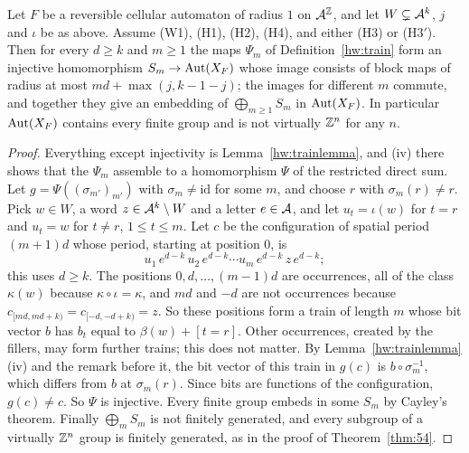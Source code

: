 \begin{theorem}\label{hw:general}
Let $F$ be a reversible cellular automaton of radius $1$ on $\mathcal{A}^{\mathbb{Z}}$, and let $W\subsetneq\mathcal{A}^k$, $j$ and $\iota$ be as above. Assume \textup{(W1)}, \textup{(H1)}, \textup{(H2)}, \textup{(H4)}, and either \textup{(H3)} or \textup{(H3$'$)}. Then for every $d\ge k$ and $m\ge1$ the maps $\Psi_m$ of Definition~\ref{hw:train} form an injective homomorphism $S_m\to\operatorname{Aut}(X_F)$ whose image consists of block maps of radius at most $md+\max(j,k-1-j)$; the images for different $m$ commute, and together they give an embedding of $\bigoplus_{m\ge1}S_m$ in $\operatorname{Aut}(X_F)$. In particular $\operatorname{Aut}(X_F)$ contains every finite group and is not virtually $\mathbb{Z}^n$ for any $n$.
\end{theorem}

\begin{proof}
Everything except injectivity is Lemma~\ref{hw:trainlemma}, and (iv) there shows that the $\Psi_m$ assemble to a homomorphism $\Psi$ of the restricted direct sum. Let $g=\Psi((\sigma_{m'})_{m'})$ with $\sigma_m\ne\mathrm{id}$ for some $m$, and choose $r$ with $\sigma_m(r)\ne r$. Pick $w\in W$, a word $z\in\mathcal{A}^k\setminus W$ and a letter $e\in\mathcal{A}$, and let $u_t=\iota(w)$ for $t=r$ and $u_t=w$ for $t\ne r$, $1\le t\le m$. Let $c$ be the configuration of spatial period $(m+1)d$ whose period, starting at position $0$, is
\[
u_1\,e^{d-k}\,u_2\,e^{d-k}\cdots u_m\,e^{d-k}\,z\,e^{d-k};
\]
this uses $d\ge k$. The positions $0,d,\dots,(m-1)d$ are occurrences, all of the class $\kappa(w)$ because $\kappa\circ\iota=\kappa$, and $md$ and $-d$ are not occurrences because $c_{[md,md+k)}=c_{[-d,-d+k)}=z$. So these positions form a train of length $m$ whose bit vector $b$ has $b_t$ equal to $\beta(w)+[t=r]$. Other occurrences, created by the fillers, may form further trains; this does not matter. By Lemma~\ref{hw:trainlemma}(iv) and the remark before it, the bit vector of this train in $g(c)$ is $b\circ\sigma_m^{-1}$, which differs from $b$ at $\sigma_m(r)$. Since bits are functions of the configuration, $g(c)\ne c$. So $\Psi$ is injective. Every finite group embeds in some $S_m$ by Cayley's theorem. Finally $\bigoplus_mS_m$ is not finitely generated, and every subgroup of a virtually $\mathbb{Z}^n$ group is finitely generated, as in the proof of Theorem~\ref{thm:54}.
\end{proof}

